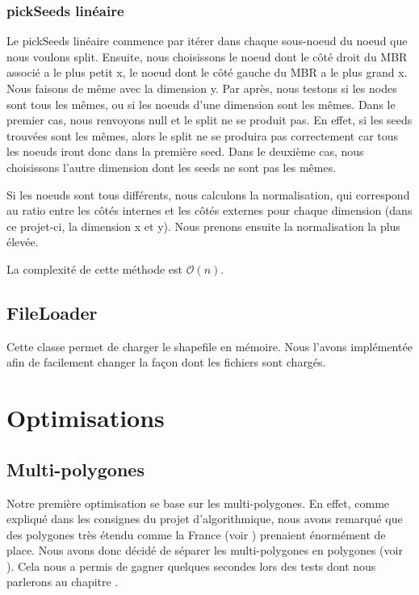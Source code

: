\documentclass[utf8]{article}
\begin{document}
\begin{large}
    \subsubsection{pickSeeds linéaire}\label{PickSeeds lineaire}
    \indent
    \par
    Le pickSeeds linéaire commence par itérer dans chaque sous-noeud du noeud
    que nous voulons split. Ensuite, nous choisissons le noeud dont le côté droit du MBR
    associé a le plus petit x, le noeud dont le côté gauche du MBR a le plus grand
    x. Nous faisons de même avec la dimension y. Par après, nous testons si les
    nodes sont tous les mêmes, ou si les noeuds d'une dimension sont les mêmes.
    Dans le premier cas, nous renvoyons null et le split ne se produit pas. En
    effet, si les seeds trouvées sont les mêmes, alors le split ne se produira pas
    correctement car tous les noeuds iront donc dans la première seed. Dans le
    deuxième cas, nous choisissons l'autre dimension dont les seeds ne sont pas
    les mêmes.
    \par
    \indent
    \par
    Si les noeuds sont tous différents, nous calculons la normalisation, qui
    correspond au ratio entre les côtés internes et les côtés externes pour chaque
    dimension (dans ce projet-ci, la dimension x et y). Nous prenons ensuite la
    normalisation la plus élevée.
    \par
    \par
    \indent
    La complexité de cette méthode est $\mathcal O(n)$.
    \par

    \subsection{FileLoader}
    \indent
    \par
    Cette classe permet de charger le shapefile en mémoire. Nous l'avons implémentée
    afin de facilement changer la façon dont les fichiers sont chargés.


    \section{Optimisations}
    \subsection{Multi-polygones}
    \indent
    \par
    Notre première optimisation se base sur les multi-polygones. En effet, comme
    expliqué dans les consignes du projet d'algorithmique, nous avons remarqué que
    des polygones très étendu comme la France (voir )
    prenaient énormément de place. Nous avons donc décidé de séparer les
    multi-polygones en polygones (voir ). Cela nous a
    permis de gagner quelques secondes lors des tests dont nous parlerons au
    chapitre .


\end{large}
\end{document}
